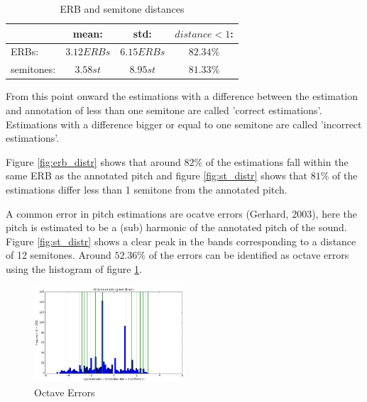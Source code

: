 \documentclass{proc}
\begin{document}
\begin{table}[h]
    \begin{center}
        \begin{tabular}{ | l | c | c | c |}
            \hline
                        &   mean:       &   std:        &   $distance < 1$:\\  \hline
            ERBs:       &   $3.12ERBs$  &   $6.15ERBs$  &   $82.34\%$   \\  \hline
            semitones:  &   $3.58st$    &   $8.95st$    &   $81.33\%$   \\  
            \hline
        \end{tabular}
        \caption{ERB and semitone distances}
        \label{table:ERB_st}
    \end{center}
\end{table}

From this point onward the estimations with a difference between the estimation and annotation of less than one semitone are called 'correct estimations'. Estimations with a difference bigger or equal to one semitone are called 'incorrect estimations'.

Figure \ref{fig:erb_distr} shows that around $82\%$ of the estimations fall within the same ERB as the annotated pitch and figure \ref{fig:st_distr} shows that $81\%$ of the estimations differ less than 1 semitone from the annotated pitch.

A common error in pitch estimations are ocatve errors (Gerhard, 2003), here the pitch is estimated to be a (sub) harmonic of the annotated pitch of the sound. Figure \ref{fig:st_distr} shows a clear peak in the bands corresponding to a distance of 12 semitones. Around $52.36\%$ of the errors can be identified as octave errors using the histogram of figure \ref{fig:octerr1}.

\begin{figure}
    \centering
    \includegraphics[width=0.5\textwidth]{img/octerr1.png}
    \caption{Octave Errors}
    \label{fig:octerr1}
\end{figure}
\end{document}

